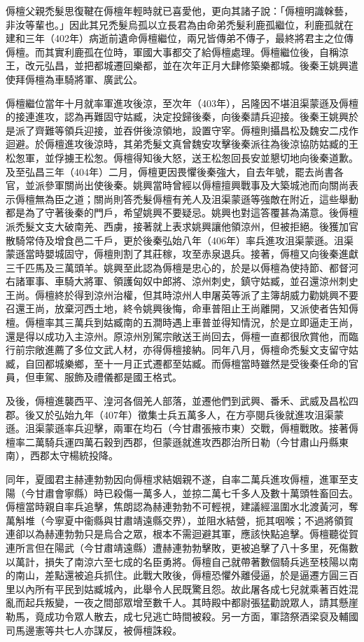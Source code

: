 傉檀父親禿髮思復鞬在傉檀年輕時就已喜愛他，更向其諸子說：「傉檀明識榦藝，非汝等輩也。」因此其兄禿髮烏孤以立長君為由命弟禿髮利鹿孤繼位，利鹿孤就在建和三年（402年）病逝前遺命傉檀繼位，兩兄皆傳弟不傳子，最終將君主之位傳傉檀。而其實利鹿孤在位時，軍國大事都交了給傉檀處理。傉檀繼位後，自稱涼王，改元弘昌，並把都城遷回樂都，並在次年正月大肆修築樂都城。後秦王姚興遣使拜傉檀為車騎將軍、廣武公。

傉檀繼位當年十月就率軍進攻後涼，至次年（403年），呂隆因不堪沮渠蒙遜及傉檀的接連進攻，認為再難固守姑臧，決定投歸後秦，向後秦請兵迎接。後秦王姚興於是派了齊難等領兵迎接，並吞併後涼領地，設置守宰。傉檀則攝昌松及魏安二戍作迴避。於傉檀進攻後涼時，其弟禿髮文真曾魏安攻擊後秦派往為後涼協防姑臧的王松怱軍，並俘擄王松怱。傉檀得知後大怒，送王松怱回長安並懇切地向後秦道歉。及至弘昌三年（404年）二月，傉檀更因畏懼後秦強大，自去年號，罷去尚書各官，並派參軍關尚出使後秦。姚興當時曾經以傉檀擅興戰事及大築城池而向關尚表示傉檀無為臣之道；關尚則答禿髮傉檀有羌人及沮渠蒙遜等強敵在附近，這些舉動都是為了守著後秦的門戶，希望姚興不要疑忌。姚興也對這答覆甚為滿意。後傉檀派禿髮文支大破南羌、西虜，接著就上表求姚興讓他領涼州，但被拒絕。後獲加官散騎常侍及增食邑二千戶，更於後秦弘始八年（406年）率兵進攻沮渠蒙遜。沮渠蒙遜當時嬰城固守，傉檀則割了其莊稼，攻至赤泉退兵。接著，傉檀又向後秦進獻三千匹馬及三萬頭羊。姚興至此認為傉檀是忠心的，於是以傉檀為使持節、都督河右諸軍事、車騎大將軍、領護匈奴中郎將、涼州刺史，鎮守姑臧，並召還涼州刺史王尚。傉檀終於得到涼州治權，但其時涼州人申屠英等派了主簿胡威力勸姚興不要召還王尚，放棄河西土地，終令姚興後悔，命車普阻止王尚離開，又派使者告知傉檀。傉檀率其三萬兵到姑臧南的五澗時遇上車普並得知情況，於是立即逼走王尚，還是得以成功入主涼州。原涼州別駕宗敞送王尚回去，傉檀一直都很欣賞他，而臨行前宗敞進薦了多位文武人材，亦得傉檀接納。同年八月，傉檀命禿髮文支留守姑臧，自回都城樂鄉，至十一月正式遷都至姑臧。而傉檀當時雖然是受後秦任命的官員，但車駕、服飾及禮儀都是國王格式。

及後，傉檀進襲西平、湟河各個羌人部落，並遷他們到武興、番禾、武威及昌松四郡。後又於弘始九年（407年）徵集士兵五萬多人，在方亭閱兵後就進攻沮渠蒙遜。沮渠蒙遜率兵迎擊，兩軍在均石（今甘肅張掖市東）交戰，傉檀戰敗。接著傉檀率二萬騎兵運四萬石穀到西郡，但蒙遜就進攻西郡治所日勒（今甘肅山丹縣東南），西郡太守楊統投降。

同年，夏國君主赫連勃勃因向傉檀求結姻親不遂，自率二萬兵進攻傉檀，進軍至支陽（今甘肅會寧縣）時已殺傷一萬多人，並掠二萬七千多人及數十萬頭牲畜回去。傉檀當時親自率兵追擊，焦朗認為赫連勃勃不可輕視，建議經溫圍水北渡黃河，奪萬斛堆（今寧夏中衞縣與甘肅靖遠縣交界），並阻水結營，扼其咽喉；不過將領賀連卻以為赫連勃勃只是烏合之眾，根本不需迴避其軍，應該快點追擊。傉檀聽從賀連所言但在陽武（今甘肅靖遠縣）遭赫連勃勃擊敗，更被追擊了八十多里，死傷數以萬計，損失了南涼六至七成的名臣勇將。傉檀自己就帶著數個騎兵逃至枝陽以南的南山，差點還被追兵抓住。此戰大敗後，傉檀恐懼外離侵逼，於是逼遷方圓三百里以內所有平民到姑臧城內，此舉令人民既驚且怨。故此屠各成七兒就乘著百姓混亂而起兵叛變，一夜之間部眾增至數千人。其時殿中都尉張猛勸說眾人，請其懸崖勒馬，竟成功令眾人散去，成七兒逃亡時間被殺。另一方面，軍諮祭酒梁裒及輔國司馬邊憲等共七人亦謀反，被傉檀誅殺。

